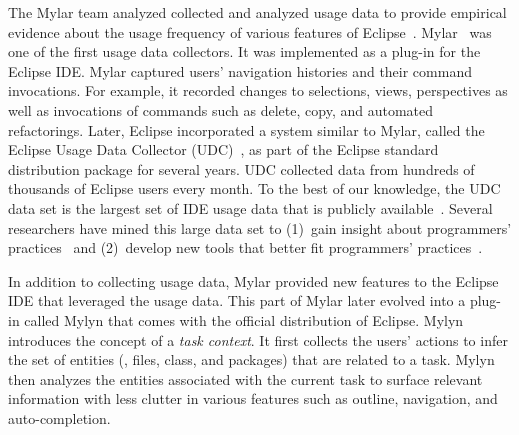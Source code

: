 The Mylar team analyzed collected and analyzed usage data to provide empirical
evidence about the usage frequency of various features of
Eclipse~\cite{V:Murphy2006How}.
%
Mylar~\cite{V:Murphy2006How} was one of the first usage data collectors. It was
implemented as a plug-in for the Eclipse IDE. Mylar captured users' navigation
histories and their command invocations. For example, it recorded changes to
selections, views, perspectives as well as invocations of commands such as
delete, copy, and automated refactorings.
%
Later, Eclipse incorporated a system similar to Mylar, called the Eclipse Usage
Data Collector (UDC)~\cite{WebPageUDC}, as part of the Eclipse standard
distribution package for several years. UDC collected data from hundreds of
thousands of Eclipse users every month. To the best of our knowledge, the UDC
data set is the largest set of IDE usage data that is publicly
available~\cite{WebPageUDCArchive}. Several researchers have mined this large
data set to
%
(1)~gain insight about programmers'
practices~\cite{VakilianJohnson2014Alternate, VakilianETAL2013Compositional,
V:MurphyHill2012How} and
%
(2)~develop new tools that better fit programmers'
practices~\cite{MurphyHill2012Improving, VakilianETAL2013Compositional,
Kersten-Mylar2005}.

In addition to collecting usage data, Mylar provided new features to the Eclipse
IDE that leveraged the usage data. This part of Mylar later evolved into a
plug-in called Mylyn that comes with the official distribution of Eclipse. Mylyn
introduces the concept of a \emph{task context}. It first collects the users'
actions to infer the set of entities (\eg, files, class, and packages) that are
related to a task. Mylyn then analyzes the entities associated with the current
task to surface relevant information with less clutter in various features such
as outline, navigation, and auto-completion.

